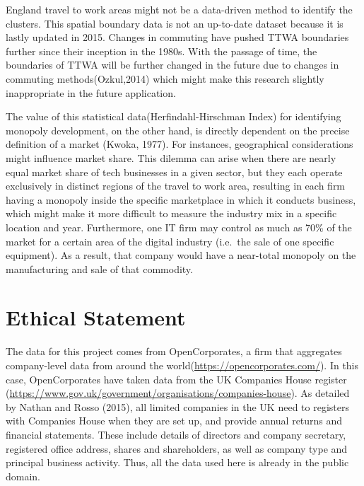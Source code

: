 \documentclass[
  12pt,
  oneside]{book}
\begin{document}
England travel to work areas might not be a data-driven method to identify the clusters. This spatial boundary data is not an up-to-date dataset because it is lastly updated in 2015. Changes in commuting have pushed TTWA boundaries further since their inception in the 1980s. With the passage of time, the boundaries of TTWA will be further changed in the future due to changes in commuting methods(Ozkul,2014) which might make this research slightly inappropriate in the future application.

The value of this statistical data(Herfindahl-Hirschman Index) for identifying monopoly development, on the other hand, is directly dependent on the precise definition of a market (Kwoka, 1977). For instances, geographical considerations might influence market share. This dilemma can arise when there are nearly equal market share of tech businesses in a given sector, but they each operate exclusively in distinct regions of the travel to work area, resulting in each firm having a monopoly inside the specific marketplace in which it conducts business, which might make it more difficult to measure the industry mix in a specific location and year. Furthermore, one IT firm may control as much as 70\% of the market for a certain area of the digital industry (i.e.~the sale of one specific equipment). As a result, that company would have a near-total monopoly on the manufacturing and sale of that commodity.

\hypertarget{ethical-statement}{%
\section{Ethical Statement}\label{ethical-statement}}

The data for this project comes from OpenCorporates, a firm that aggregates company-level data from around the world(\url{https://opencorporates.com/}). In this case, OpenCorporates have taken data from the UK Companies House register (\url{https://www.gov.uk/government/organisations/companies-house}). As detailed by Nathan and Rosso (2015), all limited companies in the UK need to registers with Companies House when they are set up, and provide annual returns and financial statements. These include details of directors and company secretary, registered office address, shares and shareholders, as well as company type and principal business activity. Thus, all the data used here is already in the public domain.
\end{document}
